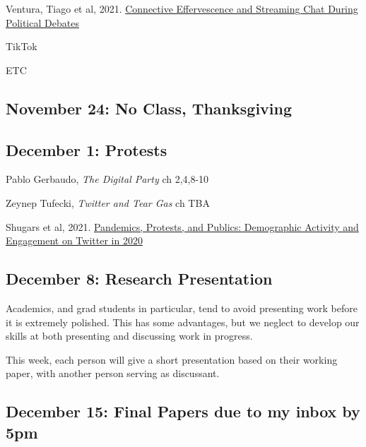 \vspace{-.1in}\documentclass[11pt]{article}
\begin{document}
Ventura, Tiago et al, 2021. \href{https://journalqd.org/article/view/2573/1820}{Connective Effervescence and Streaming Chat During Political Debates}

\noindent TikTok

\noindent ETC



\subsection*{November 24: No Class, Thanksgiving}

\subsection*{December 1:  Protests}

Pablo Gerbaudo, \textit{The Digital Party} ch 2,4,8-10

Zeynep Tufecki, \textit{Twitter and Tear Gas} ch TBA

\noindent Shugars et al, 2021. \href{https://journalqd.org/article/view/2570}{Pandemics, Protests, and Publics: Demographic Activity and Engagement on Twitter in 2020}




\subsection*{December 8: Research Presentation}

Academics, and grad students in particular, tend to avoid presenting work before it is extremely polished. This has some advantages, but we neglect to develop our skills at both presenting and discussing work in progress. 

This week, each person will give a short presentation based on their working paper, with another person serving as discussant.

\subsection*{December 15: Final Papers due to my inbox by 5pm}





\end{document}
